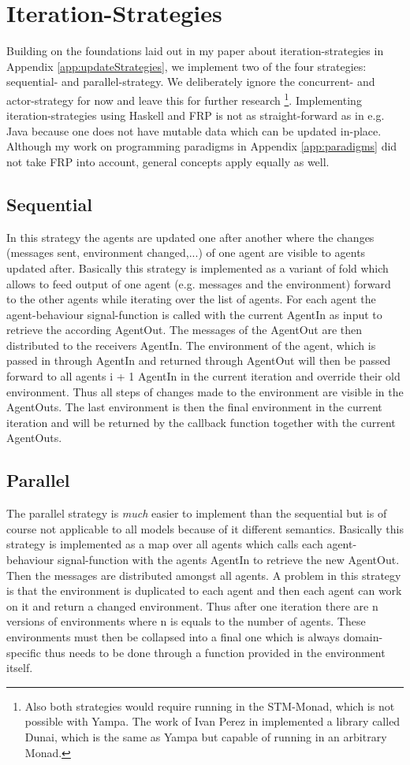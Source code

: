 \section{Iteration-Strategies}
Building on the foundations laid out in my paper about iteration-strategies in Appendix \ref{app:updateStrategies}, we implement two of the four strategies: sequential- and parallel-strategy. We deliberately ignore the concurrent- and actor-strategy for now and leave this for further research \footnote{Also both strategies would require running in the STM-Monad, which is not possible with Yampa. The work of Ivan Perez in \cite{perez_functional_2016} implemented a library called Dunai, which is the same as Yampa but capable of running in an arbitrary Monad.}.
Implementing iteration-strategies using Haskell and FRP is not as straight-forward as in e.g. Java because one does not have mutable data which can be updated in-place. Although my work on programming paradigms in Appendix \ref{app:paradigms} did not take FRP into account, general concepts apply equally as well.

\subsection{Sequential}
In this strategy the agents are updated one after another where the changes (messages sent, environment changed,...) of one agent are visible to agents updated after. Basically this strategy is implemented as a variant of fold which allows to feed output of one agent (e.g. messages and the environment) forward to the other agents while iterating over the list of agents. For each agent the agent-behaviour signal-function is called with the current AgentIn as input to retrieve the according AgentOut. The messages of the AgentOut are then distributed to the receivers AgentIn.
The environment of the agent, which is passed in through AgentIn and returned through AgentOut will then be passed forward to all agents i + 1 AgentIn in the current iteration and override their old environment. Thus all steps of changes made to the environment are visible in the AgentOuts. The last environment is then the final environment in the current iteration and will be returned by the callback function together with the current AgentOuts.

\subsection{Parallel}
The parallel strategy is \textit{much} easier to implement than the sequential but is of course not applicable to all models because of it different semantics. Basically this strategy is implemented as a map over all agents which calls each agent-behaviour signal-function with the agents AgentIn to retrieve the new AgentOut. Then the messages are distributed amongst all agents.
A problem in this strategy is that the environment is duplicated to each agent and then each agent can work on it and return a changed environment. Thus after one iteration there are n versions of environments where n is equals to the number of agents. These environments must then be collapsed into a final one which is always domain-specific thus needs to be done through a function provided in the environment itself.

